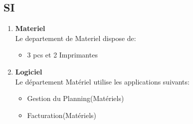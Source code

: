\documentclass [a4paper] {report}
\begin{document}
\subsection{SI}
\begin{enumerate}

\item  \textbf{Materiel}\\

Le departement de Materiel dispose de:\\

\begin{itemize}
\item 3 pcs et 2 Imprimantes\\
\end{itemize}

\item  \textbf{ Logiciel}\\

Le département Matériel utilise les applications suivants:\\

\begin{itemize}
\item  Gestion du Planning(Matériels)\\
\item  Facturation(Matériels)
\end{itemize}
\end{enumerate}
\end{document}
